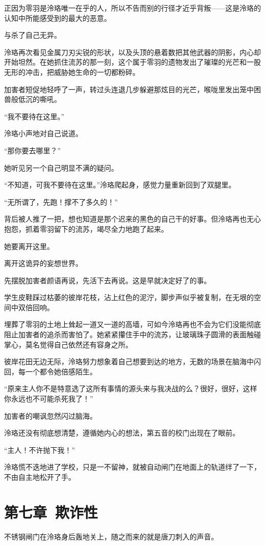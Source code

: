 \documentclass[UTF8, scheme = chinese, openany]{ctexbook}
\begin{document}
正因为零羽是泠珞唯一在乎的人，所以不告而别的行径才近乎背叛——这是泠珞的认知中所能感受到的最大的恶意。

与杀了自己无异。

泠珞再次看见金属刀刃尖锐的形状，以及头顶的悬着数把其他武器的阴影，内心却开始坦然。在她抓住流苏的那一刻，这个属于零羽的遗物发出了璀璨的光芒和一股无形的冲击，把威胁她生命的一切都粉碎。

加害者短促地轻呼了一声，转过头连退几步躲避那炫目的光芒，喉咙里发出笼中困兽般低沉的嘶吼。

“我不要待在这里。”

泠珞小声地对自己说道。

“那你要去哪里？”

她听见另一个自己明显不满的疑问。

“不知道，可我不要待在这里。”泠珞爬起身，感觉力量重新回到了双腿里。

“无所谓了，先跑！撑不了多久的！”

背后被人推了一把，想也知道是那个迟来的黑色的自己干的好事。但泠珞再也无心抱怨，抓着零羽留下的流苏，竭尽全力地跑了起来。

她要离开这里。

离开这诡异的妄想世界。

先摆脱加害者颜语再说，先活下去再说。这是早就决定好了的事。

学生皮鞋踩过枯萎的彼岸花枝，沾上红色的泥泞，脚步声似乎被复制，在无垠的空间中双倍回响。

埋葬了零羽的土地上耸起一道又一道的高墙，可如今泠珞再也不会为它们没能彻底阻止加害者的追杀而害怕了。她紧紧攥住手中的流苏，让玻璃珠子圆滑的表面触碰掌心，莫名觉得自己依然还有容身之所。

彼岸花田无边无际，泠珞努力想象着自己想要到达的地方，无数的场景在脑海中闪回，每一个都令她倍感陌生。

“原来主人你不是特意选了这所有事情的源头来与我决战的么？很好，很好，这样你永远也不可能杀死我了！”

加害者的嘲讽忽然闪过脑海。

泠珞还没有彻底想清楚，遵循她内心的想法，第五音的校门出现在了眼前。

“主人！不许抛下我！”

泠珞慌不迭地进了学校，只是一不留神，就被自动闸门在地面上的轨道绊了一下，不由自主地松开了手。

\chapter{第七章\ 欺诈性}

不锈钢闸门在泠珞身后轰地关上，随之而来的就是唐刀刺入的声音。
\end{document}
